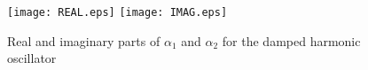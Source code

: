 \documentclass{article}
\begin{document}
\begin{figure}[tbp]
\begin{center}
\texttt{[image: REAL.eps]} \texttt{[image: IMAG.eps]}
\end{center}
\caption{Real and imaginary parts of $\alpha _{1}$ and $\alpha _{2}$ for the
damped harmonic oscillator}
\label{fig:alpha}
\end{figure}
\end{document}
